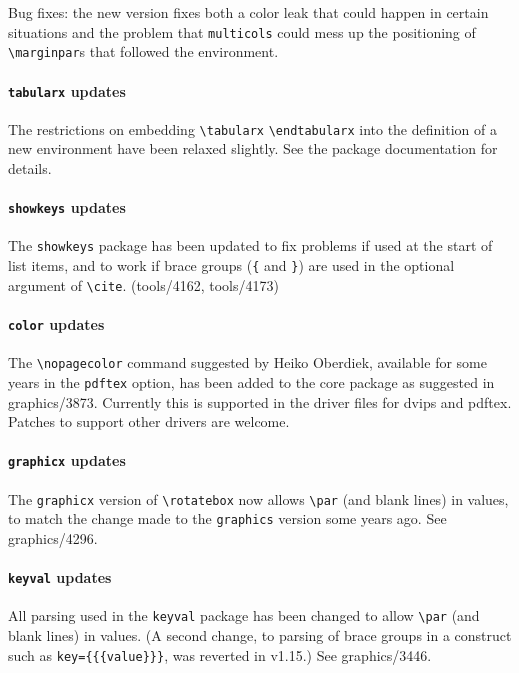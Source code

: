 \documentclass{ltnews}
\providecommand\pkg[1]{\texttt{#1}}
\providecommand\option[1]{\texttt{#1}}
\begin{document}
Bug fixes: the new version fixes both a color leak that could happen
in certain situations and the problem that \pkg{multicols} could
mess up the positioning of \verb=\marginpar=s that followed the
environment.


\paragraph{\pkg{tabularx} updates}

The restrictions on embedding \verb|\tabularx| \verb|\endtabularx|
into the definition of a new environment have been relaxed
slightly. See the package documentation for details.

\paragraph{\pkg{showkeys} updates}

The \pkg{showkeys} package has been updated to fix problems if used
at the start of list items, and to work if brace groups (\verb|{| and
\verb|}|) are used in the optional argument of
\verb|\cite|. (tools/4162, tools/4173)


\paragraph{\pkg{color} updates}

The \verb|\nopagecolor| command suggested by Heiko Oberdiek,
available for some years in the \option{pdftex} option, has been
added to the core package as suggested in graphics/3873. Currently
this is supported in the driver files for \textsf{dvips} and
\textsf{pdftex}.  Patches to support other drivers are welcome.

 \paragraph{\pkg{graphicx} updates}

The \pkg{graphicx} version of \verb|\rotatebox| now allows
\verb|\par| (and blank lines) in values, to match the change made
to the \pkg{graphics} version some years ago. See graphics/4296.


\paragraph{\pkg{keyval} updates}

All parsing used in the \pkg{keyval} package has been changed
to allow \verb|\par| (and blank lines) in values.
(A second change, to parsing of brace groups
in a construct such as \texttt{key=\{\{\{value\}\}\}}, was reverted in v1.15.)
See graphics/3446.
\end{document}
